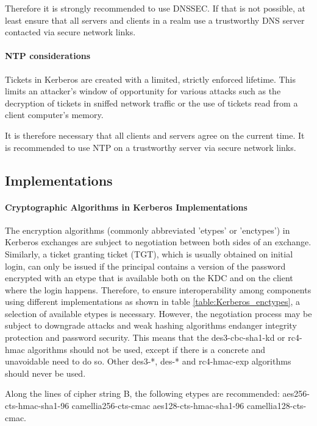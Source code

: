 Therefore it is strongly recommended to use DNSSEC.  If that is not possible, at least ensure that all servers and clients in a realm use a trustworthy DNS server contacted via secure network links.

\paragraph{NTP considerations}
Tickets in Kerberos are created with a limited, strictly enforced lifetime. This limits an attacker's window of opportunity for various attacks such as the decryption of tickets in sniffed network traffic or the use of tickets read from a client computer's memory.

It is therefore necessary that all clients and servers agree on the current time. It is recommended to use NTP on a trustworthy server via secure network links. 

\subsection{Implementations}
\label{subsection:kerberos_implementations}

\paragraph{Cryptographic Algorithms in Kerberos Implementations}

The encryption algorithms (commonly abbreviated 'etypes' or 'enctypes') in Kerberos exchanges are subject to negotiation between both sides of an exchange. Similarly, a ticket granting ticket (TGT), which is usually obtained on initial login, can only be issued if the principal contains a version of the password encrypted with an etype that is available both on the KDC and on the client where the login happens. Therefore, to ensure interoperability among components using different implementations as shown in table \ref{table:Kerberos_enctypes}, a selection of available etypes is necessary. However, the negotiation process may be subject to downgrade attacks and weak hashing algorithms endanger integrity protection and password security. This means that the des3-cbc-sha1-kd or rc4-hmac algorithms should not be used, except if there is a concrete and unavoidable need to do so. Other des3-*, des-* and rc4-hmac-exp algorithms should never be used.

Along the lines of cipher string B, the following etypes are recommended: aes256-cts-hmac-sha1-96 camellia256-cts-cmac aes128-cts-hmac-sha1-96 camellia128-cts-cmac.

